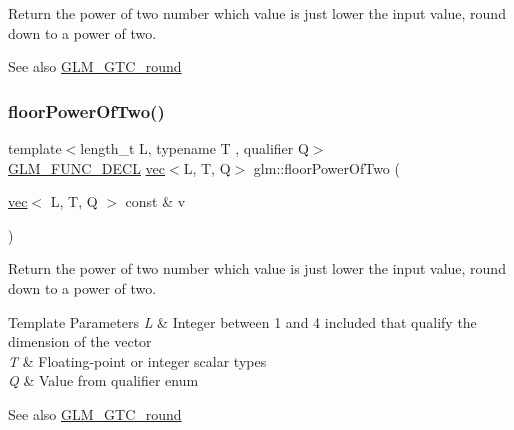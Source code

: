 Return the power of two number which value is just lower the input value, round down to a power of two.

\begin{DoxySeeAlso}{See also}
\mbox{\hyperlink{group__gtc__round}{G\+L\+M\+\_\+\+G\+T\+C\+\_\+round}} 
\end{DoxySeeAlso}
\mbox{\label{group__gtc__round_gaf0d591a8fca8ddb9289cdeb44b989c2d}} 
\subsubsection{\texorpdfstring{floor\+Power\+Of\+Two()}{floorPowerOfTwo()}\hspace{0.1cm}{\footnotesize\ttfamily [2/2]}}
{\footnotesize\ttfamily template$<$length\+\_\+t L, typename T , qualifier Q$>$ \\
\mbox{\hyperlink{setup_8hpp_ab2d052de21a70539923e9bcbf6e83a51}{G\+L\+M\+\_\+\+F\+U\+N\+C\+\_\+\+D\+E\+CL}} \mbox{\hyperlink{structglm_1_1vec}{vec}}$<$L, T, Q$>$ glm\+::floor\+Power\+Of\+Two (\begin{DoxyParamCaption}\item[{\mbox{\hyperlink{structglm_1_1vec}{vec}}$<$ L, T, Q $>$ const \&}]{v }\end{DoxyParamCaption})}

Return the power of two number which value is just lower the input value, round down to a power of two.


\begin{DoxyTemplParams}{Template Parameters}
{\em L} & Integer between 1 and 4 included that qualify the dimension of the vector \\
\hline
{\em T} & Floating-\/point or integer scalar types \\
\hline
{\em Q} & Value from qualifier enum\\
\hline
\end{DoxyTemplParams}
\begin{DoxySeeAlso}{See also}
\mbox{\hyperlink{group__gtc__round}{G\+L\+M\+\_\+\+G\+T\+C\+\_\+round}} 
\end{DoxySeeAlso}
\mbox{\label{group__gtc__round_gaec593d33956a8fe43f78fccc63ddde9a}} 
